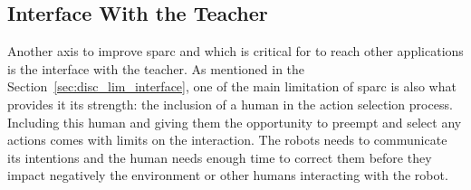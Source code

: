 
\subsection{Interface With the Teacher}

Another axis to improve \gls{sparc} and which is critical for to reach other applications is the interface with the teacher. As mentioned in the Section~\ref{sec:disc_lim_interface}, one of the main limitation of \gls{sparc} is also what provides it its strength: the inclusion of a human in the action selection process. Including this human and giving them the opportunity to preempt and select any actions comes with limits on the interaction. The robots needs to communicate its intentions and the human needs enough time to correct them before they impact negatively the environment or other humans interacting with the robot. %

